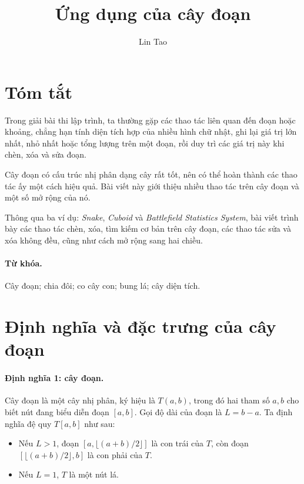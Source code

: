 \documentclass[11pt]{article}
\title{Ứng dụng của cây đoạn}
\author{Lin Tao}
\date{}
\begin{document}
\maketitle


\section*{Tóm tắt}

Trong giải bài thi lập trình, ta thường gặp các thao tác liên quan đến đoạn
hoặc khoảng, chẳng hạn tính diện tích hợp của nhiều hình chữ nhật, ghi lại
giá trị lớn nhất, nhỏ nhất hoặc tổng lượng trên một đoạn, rồi duy trì các giá
trị này khi chèn, xóa và sửa đoạn.

Cây đoạn có cấu trúc nhị phân dạng cây rất tốt, nên có thể hoàn thành các
thao tác ấy một cách hiệu quả. Bài viết này giới thiệu nhiều thao tác trên
cây đoạn và một số mở rộng của nó.

Thông qua ba ví dụ: \emph{Snake}, \emph{Cuboid} và \emph{Battlefield
Statistics System}, bài viết trình bày các thao tác chèn, xóa, tìm kiếm cơ
bản trên cây đoạn, các thao tác sửa và xóa không đều, cũng như cách mở rộng
sang hai chiều.

\paragraph{Từ khóa.}
Cây đoạn; chia đôi; co cây con; bung lá; cây diện tích.

\section{Định nghĩa và đặc trưng của cây đoạn}

\paragraph{Định nghĩa 1: cây đoạn.}
Cây đoạn là một cây nhị phân, ký hiệu là $T(a,b)$, trong đó hai tham số
$a,b$ cho biết nút đang biểu diễn đoạn $[a,b]$. Gọi độ dài của đoạn là
$L=b-a$. Ta định nghĩa đệ quy $T[a,b]$ như sau:
\begin{itemize}
  \item Nếu $L>1$, đoạn $[a,\lfloor(a+b)/2\rfloor]$ là con trái của $T$, còn
  đoạn $[\lfloor(a+b)/2\rfloor,b]$ là con phải của $T$.
  \item Nếu $L=1$, $T$ là một nút lá.
\end{itemize}
\end{document}
